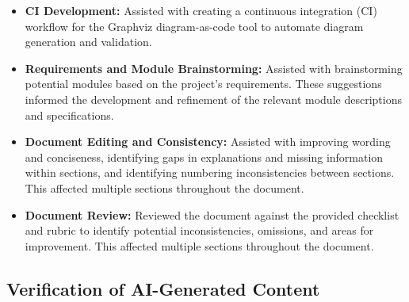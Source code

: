 \documentclass[12pt, titlepage]{article}
\begin{document}



\begin{itemize}
    \item \textbf{CI Development:} Assisted with creating a continuous integration (CI) workflow for the Graphviz
    diagram-as-code tool to automate diagram generation and validation.

    \item \textbf{Requirements and Module Brainstorming:} Assisted with brainstorming potential modules based on
    the project's requirements. These suggestions informed the development and refinement of the
    relevant module descriptions and specifications.

    \item \textbf{Document Editing and Consistency:} Assisted with improving wording and conciseness, identifying gaps
    in explanations and missing information within sections, and identifying numbering inconsistencies between sections.
    This affected multiple sections throughout the document.

    \item \textbf{Document Review:} Reviewed the document against the provided checklist and rubric to identify
    potential inconsistencies, omissions, and areas for improvement.
    This affected multiple sections throughout the document.
\end{itemize}

\subsection{Verification of AI-Generated Content}

\end{document}
